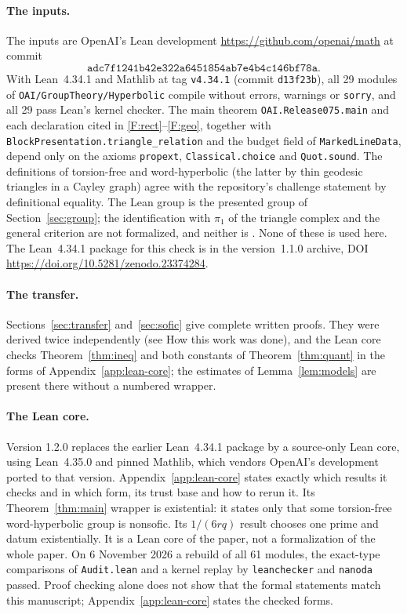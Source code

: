 \documentclass[11pt]{article}
\theoremstyle{definition}
\theoremstyle{remark}
\numberwithin{equation}{section}
\newcommand{\lean}[1]{\nolinkurl{#1}}
\begin{document}
\paragraph{The inputs.} The inputs are OpenAI's Lean development \url{https://github.com/openai/math} at commit
\[
 \texttt{adc7f1241b42e322a6451854ab7e4b4c146bf78a}.
\]
With Lean~4.34.1 and Mathlib at tag \texttt{v4.34.1} (commit \texttt{d13f23b}), all 29 modules of \lean{OAI/GroupTheory/Hyperbolic} compile without errors, warnings or \lean{sorry}, and all 29 pass Lean's kernel checker. The main theorem \lean{OAI.Release075.main} and each declaration cited in \ref{F:rect}--\ref{F:geo}, together with \lean{BlockPresentation.triangle_relation} and the budget field of \lean{MarkedLineData}, depend only on the axioms \lean{propext}, \lean{Classical.choice} and \lean{Quot.sound}. The definitions of torsion-free and word-hyperbolic (the latter by thin geodesic triangles in a Cayley graph) agree with the repository's challenge statement by definitional equality. The Lean group is the presented group of Section~\ref{sec:group}; the identification with $\pi_1$ of the triangle complex and the general criterion \cite[Theorem~2.1]{OAI252} are not formalized, and neither is \cite[Corollary~1.2]{OAI252}. None of these is used here. The Lean~4.34.1 package for this check is in the version~1.1.0 archive, DOI \url{https://doi.org/10.5281/zenodo.23374284}.

\paragraph{The transfer.} Sections~\ref{sec:transfer} and~\ref{sec:sofic} give complete written proofs. They were derived twice independently (see How this work was done), and the Lean core checks Theorem~\ref{thm:ineq} and both constants of Theorem~\ref{thm:quant} in the forms of Appendix~\ref{app:lean-core}; the estimates of Lemma~\ref{lem:models} are present there without a numbered wrapper.

\paragraph{The Lean core.} Version 1.2.0 replaces the earlier Lean~4.34.1 package by a source-only Lean core, using
Lean~4.35.0 and pinned Mathlib, which vendors OpenAI's development ported to
that version. Appendix~\ref{app:lean-core} states exactly which results it
checks and in which form, its trust base and how to rerun it. Its
Theorem~\ref{thm:main} wrapper is existential: it states only that some
torsion-free word-hyperbolic group is nonsofic. Its $1/(6rq)$ result chooses
one prime and datum existentially. It is a Lean core of the paper, not a
formalization of the whole paper. On 6 November 2026 a rebuild of all 61 modules, the exact-type comparisons of
\lean{Audit.lean} and a kernel replay by \lean{leanchecker} and \lean{nanoda} passed. Proof checking alone does not show that the formal statements match this manuscript;
Appendix~\ref{app:lean-core} states the checked forms.
\end{document}
